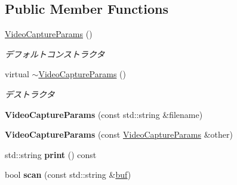 \subsection*{Public Member Functions}
\begin{DoxyCompactItemize}
\item 
\hypertarget{classskl_1_1_video_capture_params_af40b080bb9b67de7fcf94669d66cbf96}{}\label{classskl_1_1_video_capture_params_af40b080bb9b67de7fcf94669d66cbf96} 
\hyperlink{classskl_1_1_video_capture_params_af40b080bb9b67de7fcf94669d66cbf96}{Video\+Capture\+Params} ()
\begin{DoxyCompactList}\small\item\em デフォルトコンストラクタ \end{DoxyCompactList}\item 
\hypertarget{classskl_1_1_video_capture_params_aacbd136b60504c7955c2b959a130e82b}{}\label{classskl_1_1_video_capture_params_aacbd136b60504c7955c2b959a130e82b} 
virtual \hyperlink{classskl_1_1_video_capture_params_aacbd136b60504c7955c2b959a130e82b}{$\sim$\+Video\+Capture\+Params} ()
\begin{DoxyCompactList}\small\item\em デストラクタ \end{DoxyCompactList}\item 
\hypertarget{classskl_1_1_video_capture_params_a83bf21e7cadfc5457acfd5263f17e48a}{}\label{classskl_1_1_video_capture_params_a83bf21e7cadfc5457acfd5263f17e48a} 
{\bfseries Video\+Capture\+Params} (const std\+::string \&filename)
\item 
\hypertarget{classskl_1_1_video_capture_params_a29693a80e5194706ef86ccbf4d10a6a4}{}\label{classskl_1_1_video_capture_params_a29693a80e5194706ef86ccbf4d10a6a4} 
{\bfseries Video\+Capture\+Params} (const \hyperlink{classskl_1_1_video_capture_params}{Video\+Capture\+Params} \&other)
\item 
\hypertarget{classskl_1_1_video_capture_params_a2f508d9369b30d5a451fb5474d4ecf0d}{}\label{classskl_1_1_video_capture_params_a2f508d9369b30d5a451fb5474d4ecf0d} 
std\+::string {\bfseries print} () const
\item 
\hypertarget{classskl_1_1_video_capture_params_a3b6da0a862221ccd00540bdf30d3e52f}{}\label{classskl_1_1_video_capture_params_a3b6da0a862221ccd00540bdf30d3e52f} 
bool {\bfseries scan} (const std\+::string \&\hyperlink{classskl_1_1_serializable_a1d203d9f0049ce37183a0dcefbc6399a}{buf})
\item 
\hypertarget{classskl_1_1_video_capture_params_a3175df1d5cd95ea440af4bac2ef1fcc4}{}\label{classskl_1_1_video_capture_params_a3175df1d5cd95ea440af4bac2ef1fcc4} 

\end{DoxyCompactItemize}
